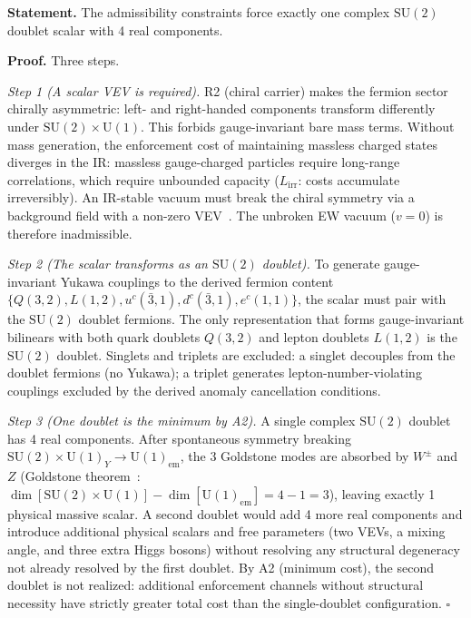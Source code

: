 \documentclass[11pt]{article}
\newcommand{\SU}{\mathrm{SU}}
\newcommand{\U}{\mathrm{U}}
\begin{document}
\begin{tcolorbox}[apfbox, title={Theorem $T_{\mathrm{Higgs}}$ (Scalar Sector)}]
\textbf{Statement.}  The admissibility constraints force exactly one complex $\SU(2)$ doublet scalar with 4 real components.

\smallskip\noindent\textbf{Proof.}  Three steps.

\textit{Step 1 (A scalar VEV is required).}  R2 (chiral carrier) makes the fermion sector chirally asymmetric: left- and right-handed components transform differently under $\SU(2) \times \U(1)$.  This forbids gauge-invariant bare mass terms.  Without mass generation, the enforcement cost of maintaining massless charged states diverges in the IR: massless gauge-charged particles require long-range correlations, which require unbounded capacity ($L_{\mathrm{irr}}$: costs accumulate irreversibly).  An IR-stable vacuum must break the chiral symmetry via a background field with a non-zero VEV~\cite{Englert1964,Higgs1964}.  The unbroken EW vacuum ($v = 0$) is therefore inadmissible.

\textit{Step 2 (The scalar transforms as an $\SU(2)$ doublet).}  To generate gauge-invariant Yukawa couplings to the derived fermion content $\{Q(3,2), L(1,2), u^c(\bar{3},1), d^c(\bar{3},1), e^c(1,1)\}$, the scalar must pair with the $\SU(2)$ doublet fermions.  The only representation that forms gauge-invariant bilinears with both quark doublets $Q(3,2)$ and lepton doublets $L(1,2)$ is the $\SU(2)$ doublet.  Singlets and triplets are excluded: a singlet decouples from the doublet fermions (no Yukawa); a triplet generates lepton-number-violating couplings excluded by the derived anomaly cancellation conditions.

\textit{Step 3 (One doublet is the minimum by A2).}  A single complex $\SU(2)$ doublet has 4 real components.  After spontaneous symmetry breaking $\SU(2) \times \U(1)_Y \to \U(1)_{\mathrm{em}}$, the 3 Goldstone modes are absorbed by $W^\pm$ and $Z$ (Goldstone theorem~\cite{Goldstone1962}: $\dim[\SU(2) \times \U(1)] - \dim[\U(1)_{\mathrm{em}}] = 4 - 1 = 3$), leaving exactly 1 physical massive scalar.  A second doublet would add 4 more real components and introduce additional physical scalars and free parameters (two VEVs, a mixing angle, and three extra Higgs bosons) without resolving any structural degeneracy not already resolved by the first doublet.  By A2 (minimum cost), the second doublet is not realized: additional enforcement channels without structural necessity have strictly greater total cost than the single-doublet configuration.  $\square$
\end{tcolorbox}
\end{document}
